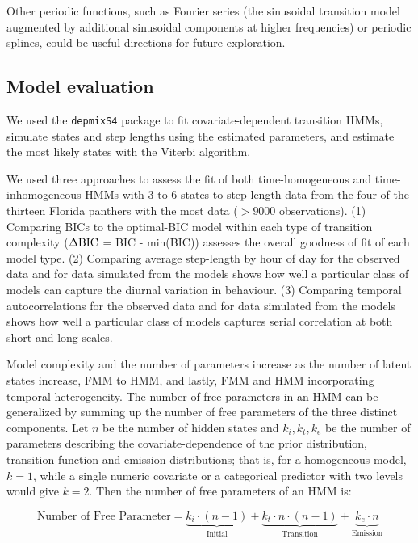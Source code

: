 \documentclass{bmcart}
\begin{document}
Other periodic functions, such as Fourier series (the sinusoidal transition model augmented by additional sinusoidal components at higher frequencies) or periodic splines, could be useful directions for future exploration.

\subsection*{Model evaluation}

We used the {\tt depmixS4} package
to fit covariate-dependent transition HMMs, 
simulate states and step lengths using the
estimated parameters, and estimate the most likely
states with the Viterbi
algorithm.

\newcommand{\dbic}{\ensuremath \Delta \textrm{BIC}}

We used three approaches to assess the fit of both time-homogeneous and time-inhomogeneous 
HMMs with 3 to 6 states to step-length data from the four of the thirteen Florida panthers 
with the most data ($> 9000 $ observations). (1) Comparing BICs to the optimal-BIC model 
within each type of transition complexity ($\dbic$ = BIC - min(BIC)) assesses the overall 
goodness of fit of each model type. (2) Comparing average step-length by hour of day for the 
observed data and for data simulated from the models shows how well a particular class of 
models can capture the diurnal variation in behaviour. (3) Comparing temporal autocorrelations
for the observed data and for data simulated from the models shows how well a particular class
of models captures serial correlation at both short and long scales.

Model complexity and the number of parameters increase as the number of latent states increase, FMM to HMM, and lastly, FMM and HMM incorporating temporal heterogeneity. The number of free parameters in an HMM can be generalized by summing up the number of free parameters of the three distinct components. Let $n$ be the number of hidden states and $k_{i}, k_{t}, k_{e}$ be the number of parameters describing the covariate-dependence of the prior distribution, transition function and emission distributions; that is, for a homogeneous model, $k=1$, while a single numeric covariate or a categorical predictor with two levels would give $k=2$. Then the number of free parameters of an HMM is:

\begin{equation}
\textrm{Number of Free Parameter}=\underbrace{k_{i}\cdot (n-1)}_{\text{Initial}} 
{+} \underbrace{k_{t}\cdot n\cdot (n-1)}_{\text{Transition}}
{+} \underbrace{ k_{e}\cdot n}_{\text{Emission}}
\label{eq:numparam}
\end{equation}
\end{document}

